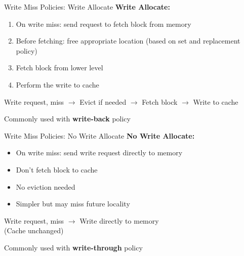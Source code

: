\documentclass[aspectratio=169,12pt]{beamer}
\begin{document}
\begin{frame}{Write Miss Policies: Write Allocate}
\textbf{Write Allocate:}
\begin{enumerate}
    \item On write miss: send request to fetch block from memory
    \item Before fetching: free appropriate location (based on set and replacement policy)
    \item Fetch block from lower level
    \item Perform the write to cache
\end{enumerate}

\begin{center}
\begin{tcolorbox}[colback=yellow!10, width=0.9\textwidth]
Write request, miss $\rightarrow$ Evict if needed $\rightarrow$ Fetch block $\rightarrow$ Write to cache
\end{tcolorbox}
\end{center}

Commonly used with \textbf{write-back} policy
\end{frame}

\begin{frame}{Write Miss Policies: No Write Allocate}
\textbf{No Write Allocate:}
\begin{itemize}
    \item On write miss: send write request directly to memory
    \item Don't fetch block to cache
    \item No eviction needed
    \item Simpler but may miss future locality
\end{itemize}

\begin{center}
\begin{tcolorbox}[colback=orange!10, width=0.7\textwidth]
Write request, miss $\rightarrow$ Write directly to memory\\
(Cache unchanged)
\end{tcolorbox}
\end{center}

Commonly used with \textbf{write-through} policy
\end{frame}
\end{document}
